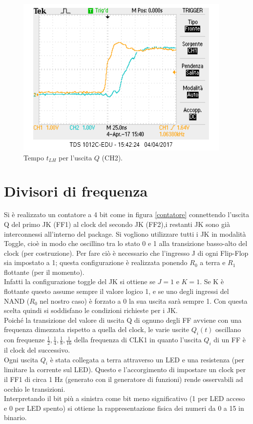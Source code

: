 \documentclass[10pt,a4paper]{article}
\begin{document}
\begin{figure}
\centering
\includegraphics[scale=1.0]{tplhQ.png}
\caption{Tempo $t_{LH}$ per l'uscita $Q$ (CH2).\label{q2}}
\end{figure}



\section{Divisori di frequenza}
Si è realizzato un contatore a 4 bit come in figura \ref{contatore} connettendo l'uscita Q del primo JK (FF1) al clock del secondo JK (FF2),i restanti JK sono già interconnessi all'interno del package. Si vogliono utilizzare tutti i JK in modalità Toggle, cioè in modo che oscillino tra lo stato 0 e 1 alla transizione basso-alto del clock (per costruzione). Per fare ciò è necessario che l'ingresso J di ogni Flip-Flop sia impostato a 1; questa configurazione è realizzata ponendo $R_0$ a terra e $R_1$ flottante (per il momento).\\
Infatti la configurazione toggle del JK si ottiene se $J = 1$ e $K = 1$. Se K è flottante questo assume sempre il valore logico 1, e se uno degli ingressi del NAND ($R_0$ nel nostro caso) è forzato a 0 la sua uscita sarà sempre 1. Con questa scelta quindi si soddisfano le condizioni richieste per i JK.\\  
Poiché la transizione del valore di uscita Q di ognuno degli FF avviene con una frequenza dimezzata rispetto a quella del clock, le varie uscite $Q_i(t)$ oscillano con frequenze $\frac{1}{2}, \frac{1}{4}, \frac{1}{8}, \frac{1}{16}$ della frequenza di CLK1 in quanto l'uscita $Q_i$ di un FF è il clock del successivo.\\
Ogni uscita $Q_i$ è stata collegata a terra attraverso un LED e una resistenza (per limitare la corrente sul LED). Questo e l'accorgimento di impostare un clock per il FF1 di circa 1 Hz (generato con il generatore di funzioni)%
 rende osservabili ad occhio le transizioni.\\
Interpretando il bit più a sinistra come bit meno significativo (1 per LED acceso e 0 per LED spento) si ottiene la rappresentazione fisica dei numeri da 0 a 15 in binario.\\
\end{document}
